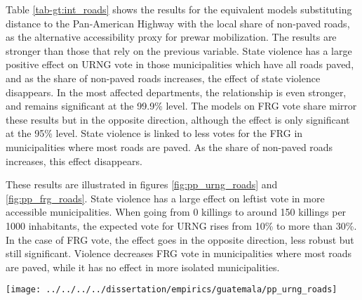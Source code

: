 \documentclass[12pt, notitlepage]{article}
\begin{document}
Table \ref{tab-gt:int_roads} shows the results for the equivalent models substituting distance to the Pan-American Highway with the local share of non-paved roads, as the alternative accessibility proxy for prewar mobilization.
The results are stronger than those that rely on the previous variable.
State violence has a large positive effect on URNG vote in those municipalities which have all roads paved, and as the share of non-paved roads increases, the effect of state violence disappears.
In the most affected departments, the relationship is even stronger, and remains significant at the 99.9\% level.
The models on FRG vote share mirror these results but in the opposite direction, although the effect is only significant at the 95\% level.
State violence is linked to less votes for the FRG in municipalities where most roads are paved. As the share of non-paved roads increases, this effect disappears.


These results are illustrated in figures \ref{fig:pp_urng_roads} and \ref{fig:pp_frg_roads}.
State violence has a large effect on leftist vote in more accessible municipalities.
When going from 0 killings to around 150 killings per 1000 inhabitants, the expected vote for URNG rises from 10\% to more than 30\%.
In the case of FRG vote, the effect goes in the opposite direction, less robust but still significant.
Violence decreases FRG vote in municipalities where most roads are paved, while it has no effect in more isolated municipalities.

\begin{figure*}[htb!]
  \centering
    \texttt{[image: ../../../../dissertation/empirics/guatemala/pp\_urng\_roads]}

  \caption{Wartime state violence and URNG share depending on prewar political mobilization (proxied by \% non-paved roads)} \label{fig:pp_urng_roads}


\end{figure*}
\end{document}
